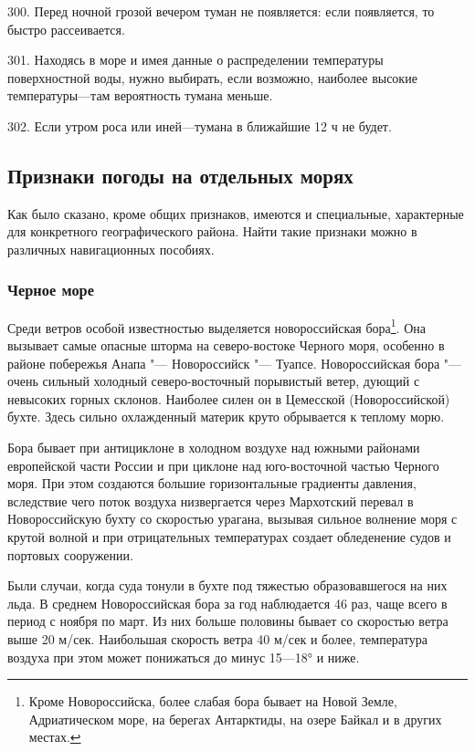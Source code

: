 300. Перед ночной грозой вечером туман не появляется: если появляется, то быстро рассеивается.

301. Находясь в море и имея данные о распределении температуры поверхностной воды, нужно выбирать, если возможно, наиболее высокие температуры—там вероятность тумана меньше.

302. Если утром роса или иней—тумана в ближайшие 12 ч не будет.

\subsection{Признаки погоды на отдельных морях}

Как было сказано, кроме общих признаков, имеются и специальные, характерные для конкретного географического района. Найти такие признаки можно в различных навигационных пособиях.

\subsubsection{Черное море}

Среди ветров особой известностью выделяется новороссийская
бора\footnote{Кроме Новороссийска, более слабая бора бывает на Новой
  Земле, Адриатическом море, на берегах Антарктиды, на озере Байкал и
  в других местах.}. Она вызывает самые опасные шторма на
северо-востоке Черного моря, особенно в районе побережья Анапа "---
Новороссийск "--- Туапсе. Новороссийская бора "--- очень сильный
холодный северо-восточный порывистый ветер, дующий с невысоких горных
склонов. Наиболее силен он в Цемесской (Новороссийской) бухте. Здесь
сильно охлажденный материк круто обрывается к теплому морю.

Бора бывает при антициклоне в холодном воздухе над южными районами европейской части России и при циклоне над юго-восточной частью Черного моря. При этом создаются большие горизонтальные градиенты давления, вследствие чего поток воздуха низвергается через Мархотский перевал в Новороссийскую бухту со скоростью урагана, вызывая сильное волнение моря с крутой волной и при отрицательных температурах создает обледенение судов и портовых сооружении.

Были случаи, когда суда тонули в бухте под тяжестью образовавшегося на них льда. В среднем Новороссийская бора за год наблюдается 46 раз, чаще всего в период с ноября по март. Из них больше половины бывает со скоростью ветра выше 20 м/сек. Наибольшая скорость ветра 40 м/сек и более, температура воздуха при этом может понижаться до минус 15—18° и ниже.

